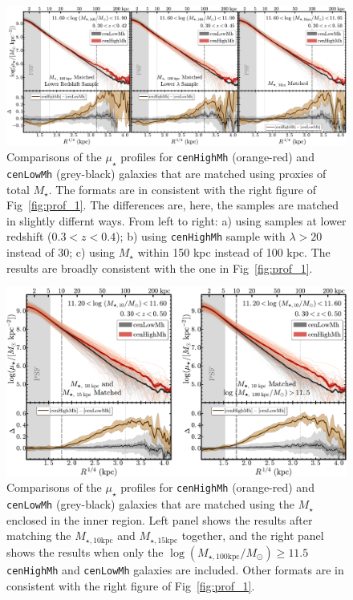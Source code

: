 \documentclass[a4paper,fleqn,usenatbib]{mnras}
\def\rbcg{\texttt{cenHighMh}}
\def\nbcg{\texttt{cenLowMh}}
\def\mstar{{$M_{\star}$}}
\def\minn{{$M_{\star,10\mathrm{kpc}}$}}
\def\meff{{$M_{\star,15\mathrm{kpc}}$}}
\def\logmtot{{$\log (M_{\star,100\mathrm{kpc}}/M_{\odot})$}}
\def\mden{{$\mu_{\star}$}}
\begin{document}
  \begin{figure}
      \centering 
      \includegraphics[width=\textwidth]{fig/redbcg_prof_3}
      \caption{
        Comparisons of the \mden{} profiles for \rbcg{} (orange-red) and \nbcg{} 
      	(grey-black) galaxies that are matched using proxies of total \mstar{}. 
        The formats are in consistent with the right figure of Fig~\ref{fig:prof_1}.
        The differences are, here, the samples are matched in slightly differnt ways. 
        From left to right: a) using samples at lower redshift ($0.3 < z < 0.4$); 
        b) using \rbcg{} sample with $\lambda > 20$ instead of 30; 
        c) using \mstar{} within 150 kpc instead of 100 kpc.
        The results are broadly consistent with the one in Fig~\ref{fig:prof_1}.
        }
      \label{fig:prof_3} 
  \end{figure}

  \begin{figure}
      \centering 
      \includegraphics[width=\textwidth]{fig/redbcg_prof_4}
      \caption{
          Comparisons of the \mden{} profiles for \rbcg{} (orange-red) and \nbcg{} 
          (grey-black) galaxies that are matched using the \mstar{} enclosed in the 
          inner region. 
          Left panel shows the results after matching the \minn{} and \meff{} together, 
          and the right panel shows the results when only the \logmtot{}$\ge 11.5$
          \rbcg{} and \nbcg{} galaxies are included.
          Other formats are in consistent with the right figure of Fig~\ref{fig:prof_1}.
          }
      \label{fig:prof_4} 
  \end{figure}
     
\end{document}
